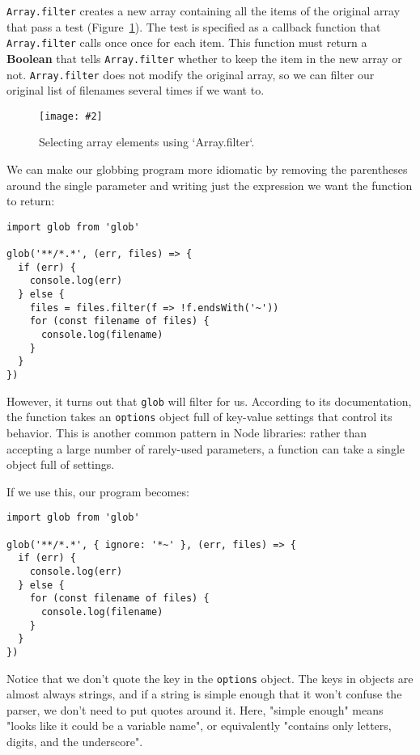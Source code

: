 \documentclass[krantzl]{krantz}
\newcommand{\figpdf}[4]{\begin{figure}%
\centering%
\texttt{[image: \#2]}%
\caption{#3}%
\label{#1}%
\end{figure}}
\newcommand{\figref}[1]{Figure~\ref{#1}}
\newcommand{\glossref}[1]{\textbf{#1}}
\begin{document}
\texttt{Array.filter} creates a new array
containing all the items of the original array that pass a test
(\figref{systems-programming-array-filter}).
The test is specified as a callback function
that \texttt{Array.filter} calls once once for each item.
This function must return a \glossref{Boolean}
that tells \texttt{Array.filter} whether to keep the item in the new array or not.
\texttt{Array.filter} does not modify the original array,
so we can filter our original list of filenames several times if we want to.

\figpdf{systems-programming-array-filter}{./systems-programming/array-filter.pdf}{Selecting array elements using `Array.filter`.}{0.6}


We can make our globbing program more idiomatic by
removing the parentheses around the single parameter
and writing just the expression we want the function to return:


\begin{lstlisting}[frame=single,frameround=tttt]
import glob from 'glob'

glob('**/*.*', (err, files) => {
  if (err) {
    console.log(err)
  } else {
    files = files.filter(f => !f.endsWith('~'))
    for (const filename of files) {
      console.log(filename)
    }
  }
})
\end{lstlisting}



However,
it turns out that \texttt{glob} will filter for us.
According to its documentation,
the function takes an \texttt{options} object full of key-value settings
that control its behavior.
This is another common pattern in Node libraries:
rather than accepting a large number of rarely-used parameters,
a function can take a single object full of settings.


If we use this,
our program becomes:


\begin{lstlisting}[frame=single,frameround=tttt]
import glob from 'glob'

glob('**/*.*', { ignore: '*~' }, (err, files) => {
  if (err) {
    console.log(err)
  } else {
    for (const filename of files) {
      console.log(filename)
    }
  }
})
\end{lstlisting}



\noindent Notice that we don't quote the key in the \texttt{options} object.
The keys in objects are almost always strings,
and if a string is simple enough that it won't confuse the parser,
we don't need to put quotes around it.
Here,
"simple enough" means "looks like it could be a variable name",
or equivalently "contains only letters, digits, and the underscore".
\end{document}
